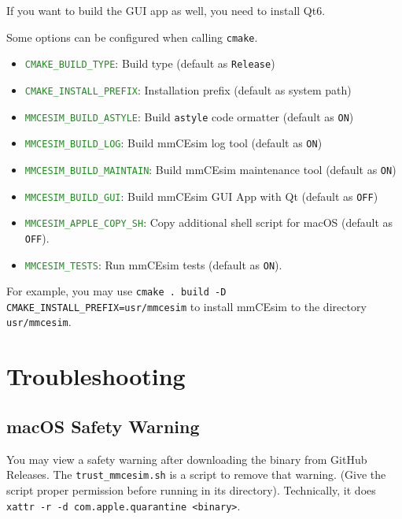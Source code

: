 If you want to build the GUI app as well, you need to install Qt6.
\newline

Some options can be configured when calling \texttt{cmake}.
\begin{itemize}
  \item \textcolor{forestgreen}{\texttt{CMAKE\_BUILD\_TYPE}}: Build type (default as \texttt{Release})
  \item \textcolor{forestgreen}{\texttt{CMAKE\_INSTALL\_PREFIX}}: Installation prefix (default as system path)
  \item \textcolor{forestgreen}{\texttt{MMCESIM\_BUILD\_ASTYLE}}: Build \texttt{astyle} code ormatter (default as \texttt{ON})
  \item \textcolor{forestgreen}{\texttt{MMCESIM\_BUILD\_LOG}}: Build mmCEsim log tool (default as \texttt{ON})
  \item \textcolor{forestgreen}{\texttt{MMCESIM\_BUILD\_MAINTAIN}}: Build mmCEsim maintenance tool (default as \texttt{ON})
  \item \textcolor{forestgreen}{\texttt{MMCESIM\_BUILD\_GUI}}: Build mmCEsim GUI App with Qt (default as \texttt{OFF})
  \item \textcolor{forestgreen}{\texttt{MMCESIM\_APPLE\_COPY\_SH}}: Copy additional shell script for macOS (default as \texttt{OFF}).
  \item \textcolor{forestgreen}{\texttt{MMCESIM\_TESTS}}: Run mmCEsim tests (default as \texttt{ON}).
\end{itemize}

For example, you may use \lstinline[morekeywords={cmake}]{cmake . build -D CMAKE_INSTALL_PREFIX=usr/mmcesim}
to install mmCEsim to the directory \texttt{usr/mmcesim}.

\section{Troubleshooting}
\subsection{macOS Safety Warning}
You may view a safety warning after downloading the binary from GitHub Releases.
The \texttt{trust\_mmcesim.sh} is a script to remove that warning.
(Give the script proper permission before running in its directory).
Technically, it does \lstinline[morekeywords={xattr}]{xattr -r -d com.apple.quarantine <binary>}.
